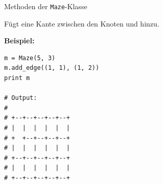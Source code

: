 \documentclass{beamer}
\begin{document}
\begin{frame}[fragile,t]{Methoden der \verb~Maze~-Klasse}

\smallskip\noindent
Fügt eine Kante zwischen den Knoten  und  hinzu.

\medskip\noindent
\textbf{Beispiel:}

\medskip
\begin{verbatim}
m = Maze(5, 3)
m.add_edge((1, 1), (1, 2))
print m

# Output:
#
# +--+--+--+--+--+
# |  |  |  |  |  |
# +  +--+--+--+--+
# |  |  |  |  |  |
# +--+--+--+--+--+
# |  |  |  |  |  |
# +--+--+--+--+--+
\end{verbatim}
\end{frame}

\end{document}
